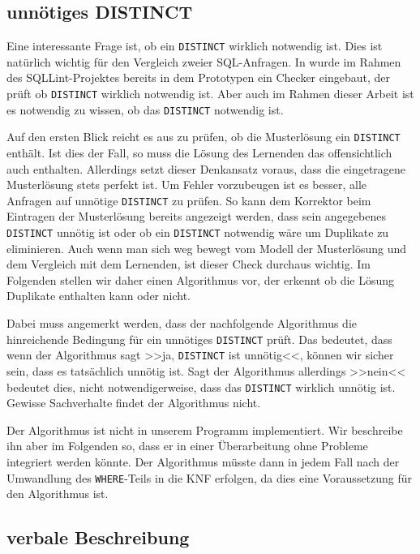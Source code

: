 \subsection{unnötiges DISTINCT}

Eine interessante Frage ist, ob ein \verb|DISTINCT| wirklich notwendig ist. Dies ist natürlich wichtig für den Vergleich zweier SQL-Anfragen. In \cite{brass2} wurde im Rahmen des SQLLint-Projektes bereits in dem Prototypen ein Checker eingebaut, der prüft ob \verb|DISTINCT| wirklich notwendig ist. Aber auch im Rahmen dieser Arbeit ist es notwendig zu wissen, ob das \verb|DISTINCT| notwendig ist. 

Auf den ersten Blick reicht es aus zu prüfen, ob die Musterlösung ein \verb|DISTINCT| enthält. Ist dies der Fall, so muss die Lösung des Lernenden das offensichtlich auch enthalten. Allerdings setzt dieser Denkansatz voraus, dass die eingetragene Musterlösung stets perfekt ist. Um Fehler vorzubeugen ist es besser, alle Anfragen auf unnötige \verb|DISTINCT| zu prüfen. So kann dem Korrektor beim Eintragen der Musterlösung bereits angezeigt werden, dass sein angegebenes \verb|DISTINCT| unnötig ist oder ob ein \verb|DISTINCT| notwendig wäre um Duplikate zu eliminieren. Auch wenn man sich weg bewegt vom Modell der Musterlösung und dem Vergleich mit dem Lernenden, ist dieser Check durchaus wichtig. Im Folgenden stellen wir daher einen Algorithmus vor, der erkennt ob die Lösung Duplikate enthalten kann oder nicht.

Dabei muss angemerkt werden, dass der nachfolgende Algorithmus die hinreichende Bedingung für ein unnötiges \verb|DISTINCT| prüft. Das bedeutet, dass wenn der Algorithmus sagt >>ja, \verb|DISTINCT| ist unnötig<<, können wir sicher sein, dass es tatsächlich unnötig ist. Sagt der Algorithmus allerdings >>nein<< bedeutet dies, nicht notwendigerweise, dass das \verb|DISTINCT| wirklich unnötig ist. Gewisse Sachverhalte findet der Algorithmus nicht.

Der Algorithmus ist nicht in unserem Programm implementiert. Wir beschreibe ihn aber im Folgenden so, dass er in einer Überarbeitung ohne Probleme integriert werden könnte. Der Algorithmus müsste dann in jedem Fall nach der Umwandlung des \verb|WHERE|-Teils in die KNF erfolgen, da dies eine Voraussetzung für den Algorithmus ist.

\subsection{verbale Beschreibung}

